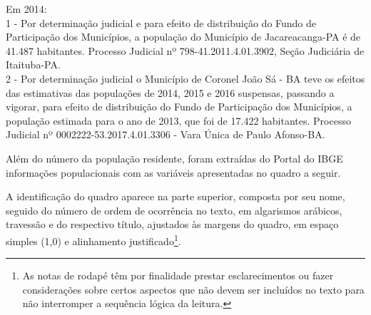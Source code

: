 \begin{table}[!h]
{\begin{flushright}
\begin{minipage}[b]{13.9cm}
\begin{SingleSpace}
\begin{footnotesize}
\hspace*{0.9cm} Em 2014: \\
\hspace*{0.9cm}1 - Por determinação judicial e para efeito de distribuição do Fundo de Participação dos Municípios, a população do Município de Jacareacanga-PA é de 41.487 habitantes. Processo Judicial nº 798-41.2011.4.01.3902, Seção Judiciária de Itaituba-PA. \\
\hspace*{0.9cm} 2 - Por determinação judicial o Município de Coronel João Sá - BA teve os efeitos das estimativas das populações de 2014, 2015 e 2016 suspensas, passando a vigorar, para efeito de distribuição do Fundo de Participação dos Municípios, a população estimada para o ano de 2013, que foi de 17.422 habitantes. Processo Judicial nº 0002222-53.2017.4.01.3306 - Vara Única de Paulo Afonso-BA.
\end{footnotesize}
\end{SingleSpace}
\end{minipage}
\end{flushright}
}
\end{table}

\newpage

Além do número da população residente, foram extraídas do Portal do IBGE informações populacionais com as variáveis apresentadas no quadro a seguir.

A identificação do quadro aparece na parte superior, composta por seu nome, seguido do número de ordem de ocorrência no texto, em algarismos arábicos, travessão e do respectivo título, ajustados às margens do quadro, em espaço simples (1,0) e alinhamento justificado\footnote{As notas de rodapé têm por finalidade prestar esclarecimentos ou fazer considerações sobre certos aspectos que não devem ser incluídos no texto para não interromper a sequência lógica da leitura.}.

\begin{quadro}[!h]	
\centering
\label{qua:exemplo-1}
\end{quadro}

